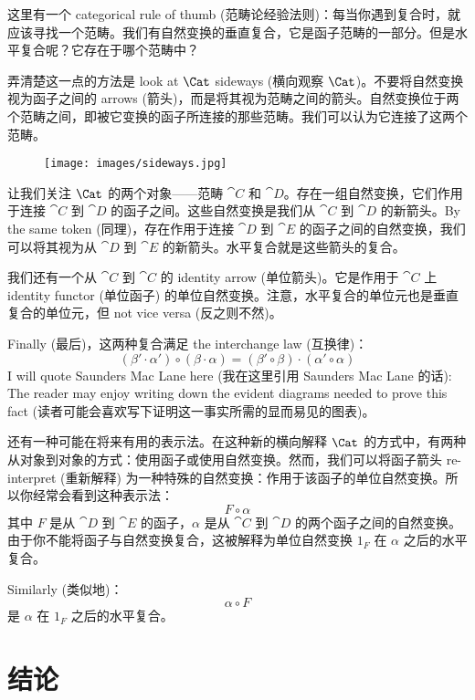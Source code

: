 这里有一个 categorical rule of thumb (范畴论经验法则)：每当你遇到复合时，就应该寻找一个范畴。我们有自然变换的垂直复合，它是函子范畴的一部分。但是水平复合呢？它存在于哪个范畴中？

弄清楚这一点的方法是 look at $\Cat$ sideways (横向观察 $\Cat$)。不要将自然变换视为函子之间的 arrows (箭头)，而是将其视为范畴之间的箭头。自然变换位于两个范畴之间，即被它变换的函子所连接的那些范畴。我们可以认为它连接了这两个范畴。

\begin{figure}[H]
  \centering
  \texttt{[image: images/sideways.jpg]}
\end{figure}

\noindent
让我们关注 $\Cat$ 的两个对象——范畴 $\cat{C}$ 和 $\cat{D}$。存在一组自然变换，它们作用于连接 $\cat{C}$ 到 $\cat{D}$ 的函子之间。这些自然变换是我们从 $\cat{C}$ 到 $\cat{D}$ 的新箭头。By the same token (同理)，存在作用于连接 $\cat{D}$ 到 $\cat{E}$ 的函子之间的自然变换，我们可以将其视为从 $\cat{D}$ 到 $\cat{E}$ 的新箭头。水平复合就是这些箭头的复合。

我们还有一个从 $\cat{C}$ 到 $\cat{C}$ 的 identity arrow (单位箭头)。它是作用于 $\cat{C}$ 上 identity functor (单位函子) 的单位自然变换。注意，水平复合的单位元也是垂直复合的单位元，但 not vice versa (反之则不然)。

Finally (最后)，这两种复合满足 the interchange law (互换律)：
\[(\beta' \cdot \alpha') \circ (\beta \cdot \alpha) = (\beta' \circ \beta) \cdot (\alpha' \circ \alpha)\]
I will quote Saunders Mac Lane here (我在这里引用 Saunders Mac Lane 的话): The reader may enjoy writing down the evident diagrams needed to prove this fact (读者可能会喜欢写下证明这一事实所需的显而易见的图表)。

还有一种可能在将来有用的表示法。在这种新的横向解释 $\Cat$ 的方式中，有两种从对象到对象的方式：使用函子或使用自然变换。然而，我们可以将函子箭头 re-interpret (重新解释) 为一种特殊的自然变换：作用于该函子的单位自然变换。所以你经常会看到这种表示法：
\[F \circ \alpha\]
其中 $F$ 是从 $\cat{D}$ 到 $\cat{E}$ 的函子，$\alpha$ 是从 $\cat{C}$ 到 $\cat{D}$ 的两个函子之间的自然变换。由于你不能将函子与自然变换复合，这被解释为单位自然变换 $1_F$ 在 $\alpha$ 之后的水平复合。

Similarly (类似地)：
\[\alpha \circ F\]
是 $\alpha$ 在 $1_F$ 之后的水平复合。

\section{结论}

